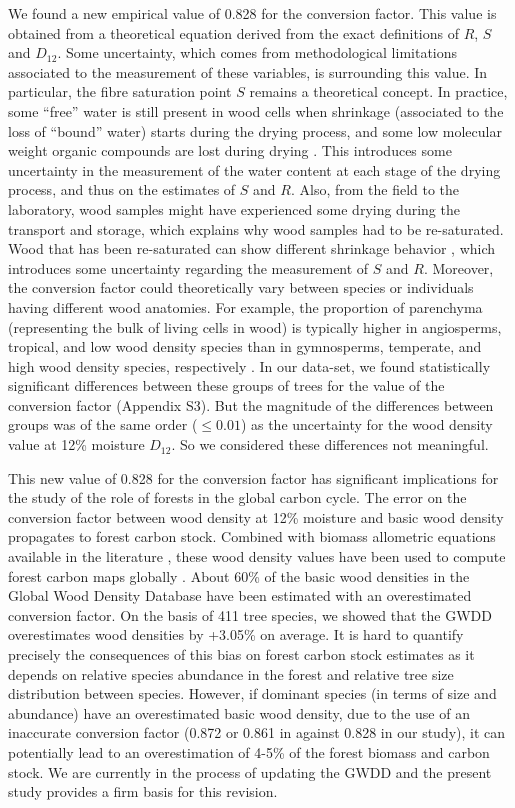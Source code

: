 \documentclass[a4paper, 12pt, leqno, dvipsnames]{article}\usepackage[]{graphicx}\usepackage[]{color}
\begin{document}
We found a new empirical value of 0.828 for the conversion factor. This value is obtained from a theoretical equation derived from the exact definitions of $R$, $S$ and $D_{12}$. Some uncertainty, which comes from methodological limitations associated to the measurement of these variables, is surrounding this value. In particular, the fibre saturation point $S$ remains a theoretical concept. In practice, some ``free'' water is still present in wood cells when shrinkage (associated to the loss of ``bound'' water) starts during the drying process, and some low molecular weight organic compounds are lost during drying \citep{Rosner2009}. This introduces some uncertainty in the measurement of the water content at each stage of the drying process, and thus on the estimates of $S$ and $R$. Also, from the field to the laboratory, wood samples might have experienced some drying during the transport and storage, which explains why wood samples had to be re-saturated. Wood that has been re-saturated can show different shrinkage behavior \citep{Glass2010}, which introduces some uncertainty regarding the measurement of $S$ and $R$. Moreover, the conversion factor could theoretically vary between species or individuals having different wood anatomies. For example, the proportion of parenchyma (representing the bulk of living cells in wood) is typically higher in angiosperms, tropical, and low wood density species than in gymnosperms, temperate, and high wood density species, respectively \citep{Morris2016}. In our data-set, we found statistically significant differences between these groups of trees for the value of the conversion factor (Appendix S3). But the magnitude of the differences between groups was of the same order ($\leq 0.01$) as the uncertainty for the wood density value at 12\% moisture $D_{12}$. So we considered these differences not meaningful.

This new value of 0.828 for the conversion factor has significant implications for the study of the role of forests in the global carbon cycle. The error on the conversion factor between wood density at 12\% moisture and basic wood density propagates to forest carbon stock. Combined with biomass allometric equations available in the literature \citep{Chave2005, Chave2014, Vieilledent2012}, these wood density values have been used to compute forest carbon maps globally \citep{Saatchi2011, Baccini2012, Avitabile2016, Baccini2017}. About 60\% of the basic wood densities in the Global Wood Density Database have been estimated with an overestimated conversion factor. On the basis of 411 tree species, we showed that the GWDD overestimates wood densities by +3.05\% on average. It is hard to quantify precisely the consequences of this bias on forest carbon stock estimates as it depends on relative species abundance in the forest and relative tree size distribution between species. However, if dominant species (in terms of size and abundance) have an overestimated basic wood density, due to the use of an inaccurate conversion factor (0.872 or 0.861 in \citet{Chave2006, Chave2009} against 0.828 in our study), it can potentially lead to an overestimation of 4-5\% of the forest biomass and carbon stock. We are currently in the process of updating the GWDD and the present study provides a firm basis for this revision.
\end{document}
